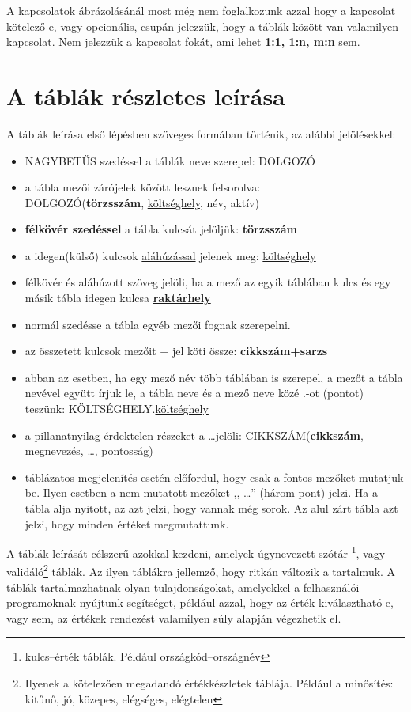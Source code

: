 \documentclass[a4paper,12pt]{report}
\newcommand{\pk}[1]{\textbf{#1}} %
\newcommand{\fk}[1]{\underline{#1}} %
\newcommand{\tabla}[1]{\noindent\MakeUppercase{#1}} %
\newcommand{\tmezo}[2]{\MakeUppercase{#1}.{\underline{#2}}} %
\begin{document}
A kapcsolatok ábrázolásánál most még nem foglalkozunk azzal hogy a kapcsolat 
kötelező-e, vagy opcionális, csupán jelezzük, hogy a táblák között van 
valamilyen kapcsolat. Nem jelezzük a kapcsolat fokát, ami lehet \textbf{1:1, 
1:n, m:n} sem.

\section{A táblák részletes leírása}
A táblák leírása első lépésben szöveges formában történik, az alábbi 
jelölésekkel:
\begin{itemize}
 \item \tabla{nagybetűs} szedéssel a táblák neve szerepel: \tabla{dolgozó}
 \item a tábla mezői zárójelek között lesznek felsorolva:\\ 
 \tabla{DOLGOZÓ}(\pk{törzsszám}, \fk{költséghely}, név, aktív)
 \item \pk{félkövér szedéssel} a tábla kulcsát jelöljük: \pk{törzsszám}
 \item a idegen(külső) kulcsok \fk{aláhúzással} jelenek meg: 
 \fk{költséghely}
 \item félkövér és aláhúzott szöveg jelöli, ha a mező az egyik táblában kulcs 
és egy másik tábla idegen kulcsa \pk{\fk{raktárhely}} 
\item normál szedésse a tábla egyéb mezői fognak szerepelni.
\item az összetett kulcsok mezőit $+$ jel köti össze: \pk{cikkszám+sarzs}
\item abban az esetben, ha egy mező név több táblában is szerepel, a mezőt 
a tábla nevével együtt írjuk le, a tábla neve és a mező neve közé .-ot 
(pontot) teszünk: \tmezo{KÖLTSÉGHELY}{költséghely}
\item a pillanatnyilag érdektelen részeket a \dots jelöli:
\tabla{cikkszám}(\pk{cikkszám}, megnevezés, \dots, pontosság)
\item táblázatos megjelenítés esetén előfordul, hogy csak a fontos mezőket 
mutatjuk be. Ilyen esetben a nem mutatott mezőket ,, \dots  '' (három pont) 
jelzi. Ha a tábla alja nyitott, az azt jelzi, hogy vannak még sorok. Az 
alul zárt tábla azt jelzi, hogy minden értéket megmutattunk.
\end{itemize}

A táblák leírását célszerű azokkal kezdeni, amelyek úgynevezett 
szótár-\footnote{kulcs--érték táblák. Például országkód--országnév}, vagy
validáló\footnote{Ilyenek a kötelezően megadandó értékkészletek táblája. 
Például a minősítés: kitűnő, jó, közepes, elégséges, elégtelen} táblák.
Az ilyen táblákra jellemző, hogy ritkán változik a tartalmuk. A táblák 
tartalmazhatnak olyan tulajdonságokat, amelyekkel a felhasználói
programoknak nyújtunk segítséget, például azzal, hogy az érték
kiválasztható-e, vagy sem, az értékek rendezést valamilyen súly alapján 
végezhetik el.
\end{document}
